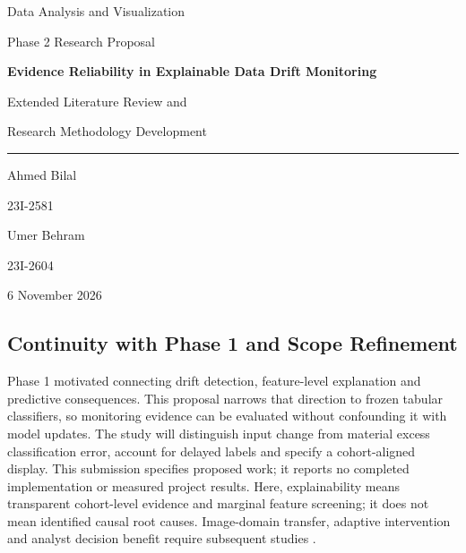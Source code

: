 \documentclass[11pt,a4paper]{article}
\begin{document}
\begin{titlepage}
\centering
\vspace*{20mm}
{\large Data Analysis and Visualization\par}
\vspace{3mm}
{\normalsize Phase 2 Research Proposal\par}
\vspace{20mm}
\begin{minipage}{0.85\textwidth}
\centering
{\color{titleblue}\LARGE\bfseries
Evidence Reliability in Explainable Data Drift Monitoring\par}
\vspace{7mm}
{\large Extended Literature Review and\par
Research Methodology Development\par}
\end{minipage}
\vspace{14mm}
{\color{titleblue}\rule{0.56\textwidth}{0.5pt}\par}
\vspace{11mm}
{\large Ahmed Bilal\par}
{\normalsize 23I-2581\par}
\vspace{6mm}
{\large Umer Behram\par}
{\normalsize 23I-2604\par}
\vfill
{\normalsize 6 November 2026\par}
\vspace*{14mm}
\end{titlepage}
\pagestyle{plain}
\setcounter{page}{1}

\subsection*{Continuity with Phase 1 and Scope Refinement}
Phase 1 motivated connecting drift detection, feature-level explanation and
predictive consequences. This proposal narrows that direction to frozen
tabular classifiers, so monitoring evidence can be evaluated without confounding
it with model updates. The study will distinguish input change from material
excess classification error, account for delayed labels and specify a
cohort-aligned display. This submission specifies proposed work; it reports no
completed implementation or measured project results. Here, explainability
means transparent cohort-level evidence and marginal feature screening; it
does not mean identified causal root causes. Image-domain transfer, adaptive intervention and analyst
decision benefit require subsequent studies \cite{greco,szucs,guerrero,driftvis,souza}.
\end{document}
